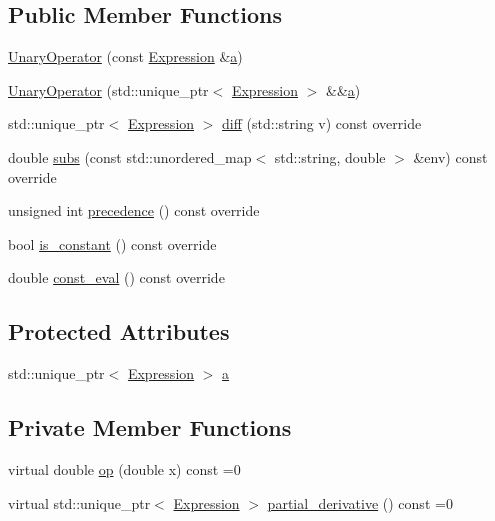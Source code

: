 \subsection*{Public Member Functions}
\begin{DoxyCompactItemize}
\item 
\mbox{\hyperlink{classsymcpp_1_1UnaryOperator_a23a8172db96675ebf1114f4f3f41b6f1}{Unary\+Operator}} (const \mbox{\hyperlink{classsymcpp_1_1Expression}{Expression}} \&\mbox{\hyperlink{classsymcpp_1_1UnaryOperator_a1558842963261562d2ef68e324822cba}{a}})
\item 
\mbox{\hyperlink{classsymcpp_1_1UnaryOperator_ad3aa899567a080eeb41cb850de310178}{Unary\+Operator}} (std\+::unique\+\_\+ptr$<$ \mbox{\hyperlink{classsymcpp_1_1Expression}{Expression}} $>$ \&\&\mbox{\hyperlink{classsymcpp_1_1UnaryOperator_a1558842963261562d2ef68e324822cba}{a}})
\item 
std\+::unique\+\_\+ptr$<$ \mbox{\hyperlink{classsymcpp_1_1Expression}{Expression}} $>$ \mbox{\hyperlink{classsymcpp_1_1UnaryOperator_a73f6af837c67e65504e4bb82111d9557}{diff}} (std\+::string v) const override
\item 
double \mbox{\hyperlink{classsymcpp_1_1UnaryOperator_aa2296c73f9ca24a739fb8c3ff246fe0e}{subs}} (const std\+::unordered\+\_\+map$<$ std\+::string, double $>$ \&env) const override
\item 
unsigned int \mbox{\hyperlink{classsymcpp_1_1UnaryOperator_a129a9c47390abceff31da35d7b847329}{precedence}} () const override
\item 
bool \mbox{\hyperlink{classsymcpp_1_1UnaryOperator_abb499ba635a63dfa605fc3639509ac1c}{is\+\_\+constant}} () const override
\item 
double \mbox{\hyperlink{classsymcpp_1_1UnaryOperator_ae44aa26276abde61e16be12814075d0a}{const\+\_\+eval}} () const override
\end{DoxyCompactItemize}
\subsection*{Protected Attributes}
\begin{DoxyCompactItemize}
\item 
std\+::unique\+\_\+ptr$<$ \mbox{\hyperlink{classsymcpp_1_1Expression}{Expression}} $>$ \mbox{\hyperlink{classsymcpp_1_1UnaryOperator_a1558842963261562d2ef68e324822cba}{a}}
\end{DoxyCompactItemize}
\subsection*{Private Member Functions}
\begin{DoxyCompactItemize}
\item 
virtual double \mbox{\hyperlink{classsymcpp_1_1UnaryOperator_a679c3c46cad3a62bdd776ff836c7891e}{op}} (double x) const =0
\item 
virtual std\+::unique\+\_\+ptr$<$ \mbox{\hyperlink{classsymcpp_1_1Expression}{Expression}} $>$ \mbox{\hyperlink{classsymcpp_1_1UnaryOperator_a85de3214870cd72edc63ac1c221ddeee}{partial\+\_\+derivative}} () const =0
\end{DoxyCompactItemize}


